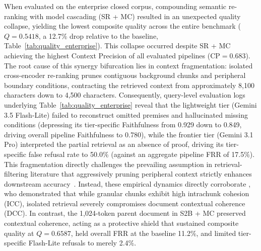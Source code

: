 When evaluated on the enterprise closed corpus, compounding semantic re-ranking with model cascading (SR + MC) resulted in an unexpected quality collapse, yielding the lowest composite quality across the entire benchmark ($Q = 0.5418$, a 12.7\% drop relative to the baseline, Table~\ref{tab:quality_enterprise}). This collapse occurred despite SR + MC achieving the highest Context Precision of all evaluated pipelines ($\text{CP} = 0.683$). The root cause of this synergy bifurcation lies in context fragmentation: isolated cross-encoder re-ranking prunes contiguous background chunks and peripheral boundary conditions, contracting the retrieved context from approximately 8,100 characters down to 4,500 characters. Consequently, query-level evaluation logs underlying Table~\ref{tab:quality_enterprise} reveal that the lightweight tier (Gemini 3.5 Flash-Lite) failed to reconstruct omitted premises and hallucinated missing conditions (depressing its tier-specific Faithfulness from 0.929 down to 0.849, driving overall pipeline Faithfulness to 0.780), while the frontier tier (Gemini 3.1 Pro) interpreted the partial retrieval as an absence of proof, driving its tier-specific false refusal rate to 50.0\% (against an aggregate pipeline FRR of 17.5\%). This fragmentation directly challenges the prevailing assumption in retrieval-filtering literature that aggressively pruning peripheral context strictly enhances downstream accuracy~\citep{wang2025infogain, yu2024rankrag}. Instead, these empirical dynamics directly corroborate \citet{demourajunior2026adaptive}, who demonstrated that while granular chunks exhibit high intrachunk cohesion (ICC), isolated retrieval severely compromises document contextual coherence (DCC). In contrast, the 1,024-token parent document in S2B + MC preserved contextual coherence, acting as a protective shield that sustained composite quality at $Q = 0.6587$, held overall FRR at the baseline 11.2\%, and limited tier-specific Flash-Lite refusals to merely 2.4\%.

